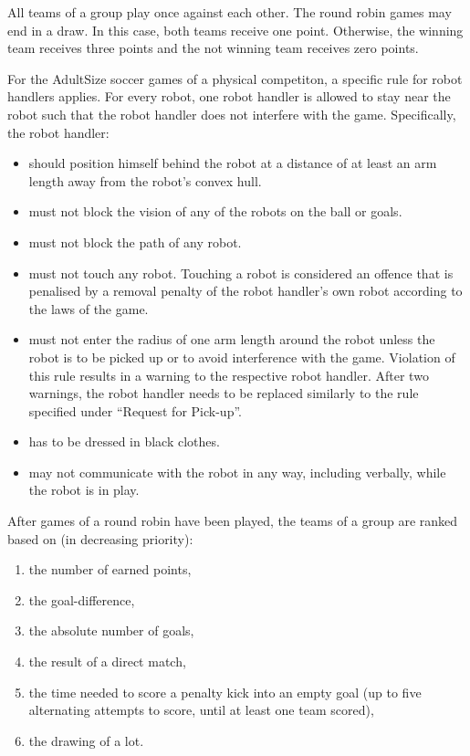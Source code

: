 \bigskip

All teams of a group play once against each other.
The round robin games may end in a draw.
In this case, both teams receive one point.
Otherwise, the winning team receives three points and the not winning team
receives zero points.

\bigskip

For the AdultSize soccer games of a physical competiton, a specific rule for robot handlers applies. For every robot, one robot handler is allowed to stay near the robot such that the robot handler does not interfere with the game. Specifically, the robot handler:
\begin{itemize}
\item should position himself behind the robot at a distance of at least an arm length away from the robot's convex hull.
\item must not block the vision of any of the robots on the ball or goals.
\item must not block the path of any robot.
\item must not touch any robot. Touching a robot is considered an offence that is penalised by a removal penalty of the robot handler's own robot according to the laws of the game.
\item must not enter the radius of one arm length around the robot unless the robot is to be picked up or to avoid interference with the game. Violation of this rule results in a warning to the respective robot handler. After two warnings, the robot handler needs to be replaced similarly to the rule specified under ``Request for Pick-up''.
\item has to be dressed in black clothes.
\item may not communicate with the robot in any way, including verbally, while the robot is in play.
\end{itemize}
\color{black}

\bigskip

After games of a round robin have been played, the teams of a group are ranked based on (in decreasing priority): 

\begin{enumerate}
\item the number of earned points,
\item the goal-difference,
\item the absolute number of goals,
\item the result of a direct match,
\item the time needed to score a penalty kick into an empty goal (up to five alternating attempts to score, until at least one team scored),
\item the drawing of a lot.
\end{enumerate}

